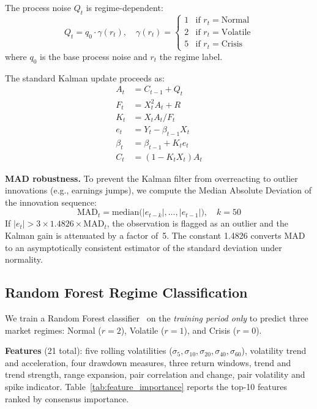 \documentclass{ieeeaccess}
\begin{document}
The process noise $Q_t$ is regime-dependent:
\begin{equation}
    Q_t = q_0 \cdot \gamma(r_t), \quad \gamma(r_t) = \begin{cases}
        1 & \text{if } r_t = \text{Normal} \\
        2 & \text{if } r_t = \text{Volatile} \\
        5 & \text{if } r_t = \text{Crisis}
    \end{cases}
    \label{eq:regime_noise}
\end{equation}
where $q_0$ is the base process noise and $r_t$ the regime label.

The standard Kalman update proceeds as:
\begin{align}
    A_t &= C_{t-1} + Q_t \label{eq:pred_cov} \\
    F_t &= X_t^2 A_t + R \label{eq:innov_cov} \\
    K_t &= X_t A_t / F_t \label{eq:gain} \\
    e_t &= Y_t - \beta_{t-1} X_t \label{eq:innov} \\
    \beta_t &= \beta_{t-1} + K_t e_t \label{eq:state_update} \\
    C_t &= (1 - K_t X_t) A_t \label{eq:cov_update}
\end{align}

\textbf{MAD robustness.}
To prevent the Kalman filter from overreacting to outlier innovations (e.g., earnings jumps), we compute the Median Absolute Deviation of the innovation sequence:
\begin{equation}
    \text{MAD}_t = \text{median}\bigl(|e_{t-k}|, \ldots, |e_{t-1}|\bigr), \quad k = 50
    \label{eq:mad}
\end{equation}
If $|e_t| > 3 \times 1.4826 \times \text{MAD}_t$, the observation is flagged as an outlier and the Kalman gain is attenuated by a factor of~5.
The constant 1.4826 converts MAD to an asymptotically consistent estimator of the standard deviation under normality.

\subsection{Random Forest Regime Classification}

We train a Random Forest classifier~\cite{breiman2001random} on the \emph{training period only} to predict three market regimes: Normal ($r=2$), Volatile ($r=1$), and Crisis ($r=0$).

\textbf{Features} (21 total): five rolling volatilities ($\sigma_{5}, \sigma_{10}, \sigma_{20}, \sigma_{40}, \sigma_{60}$), volatility trend and acceleration, four drawdown measures, three return windows, trend and trend strength, range expansion, pair correlation and change, pair volatility and spike indicator.
Table~\ref{tab:feature_importance} reports the top-10 features ranked by consensus importance.
\end{document}
